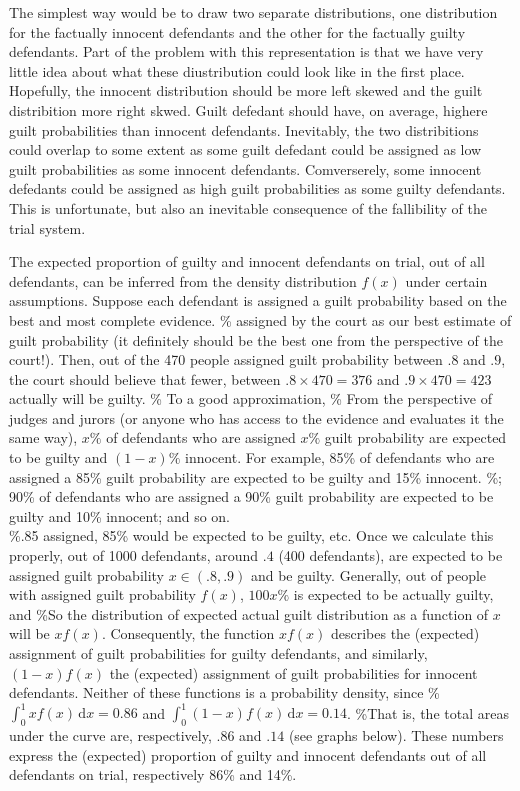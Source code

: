 \documentclass[10pt,dvipsnames,enabledeprecatedfontcommands]{scrartcl}
\begin{document}
The simplest way would be to draw two separate distributions, one
distribution for the factually innocent defendants and the other for the
factually guilty defendants. Part of the problem with this
representation is that we have very little idea about what these
diustribution could look like in the first place. Hopefully, the
innocent distribution should be more left skewed and the guilt
distribition more right skwed. Guilt defedant should have, on average,
highere guilt probabilities than innocent defendants. Inevitably, the
two distribitions could overlap to some extent as some guilt defedant
could be assigned as low guilt probabilities as some innocent
defendants. Comverserely, some innocent defedants could be assigned as
high guilt probabilities as some guilty defendants. This is unfortunate,
but also an inevitable consequence of the fallibility of the trial
system.

The expected proportion of guilty and innocent defendants on trial, out
of all defendants, can be inferred from the density distribution
\(f(x)\) under certain assumptions. Suppose each defendant is assigned a
guilt probability based on the best and most complete evidence. \%
assigned by the court as our best estimate of guilt probability (it
definitely should be the best one from the perspective of the court!).
Then, out of the 470 people assigned guilt probability between \(.8\)
and \(.9\), the court should believe that fewer, between
\(.8\times 470 = 376\) and \(.9\times 470=423\) actually will be guilty.
\% To a good approximation,
\%
From the perspective of judges and jurors (or anyone who has access to
the evidence and evaluates it the same way), \(x\%\) of defendants who
are assigned \(x\%\) guilt probability are expected to be guilty and
\((1-x)\%\) innocent. For example, 85\% of defendants who are assigned a
85\% guilt probability are expected to be guilty and 15\% innocent. \%;
90\% of defendants who are assigned a 90\% guilt probability are
expected to be guilty and 10\% innocent; and so on.\\
\%.85 assigned, 85\% would be expected to be guilty, etc. Once we
calculate this properly, out of 1000 defendants, around \(.4\) (400
defendants), are expected to be assigned guilt probability
\(x\in (.8, .9)\) and be guilty. Generally, out of people with assigned
guilt probability \(f(x)\), \(100x\%\) is expected to be actually
guilty, and \%So the distribution of expected actual guilt distribution
as a function of \(x\) will be \(x f(x)\). Consequently, the function
\(xf(x)\) describes the (expected) assignment of guilt probabilities for
guilty defendants, and similarly, \((1-x)f(x)\) the (expected)
assignment of guilt probabilities for innocent defendants. Neither of
these functions is a probability density, since
\%\(\int_0^1 \! xf(x) \, \mathrm{d}x=0.86\) and
\(\int_0^1 \! (1-x)f(x) \, \mathrm{d}x=0.14\). \%That is, the total
areas under the curve are, respectively, \(.86\) and \(.14\) (see graphs
below). These numbers express the (expected) proportion of guilty and
innocent defendants out of all defendants on trial, respectively 86\%
and 14\%.
\end{document}
